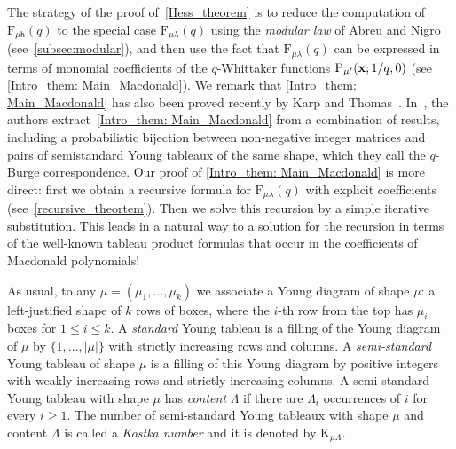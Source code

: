 \documentclass[12pt,a4paper,reqno]{amsart}
\theoremstyle{plain}
\theoremstyle{definition}
\newcommand{\1}{\mathds{1}}
\renewcommand{\P}{\mathrm{P}}
\newcommand{\F}{\mathrm{F}}
\newcommand{\K}{{\mathrm{K}}}
\newcommand{\x}{{\bf x}}
\newcommand{\hes}{\mathsf{h}}
\begin{document}
The strategy of the proof of~\cref{Hess_theorem} is to reduce the computation of  $\F_{\mu\hes}(q)$ to the special case $\F_{\mu\lambda}(q)$ using  the \emph{modular law} of Abreu and Nigro~\cite{Abreu-Nigro} (see~\cref{subsec:modular}), and then use the fact that $\F_{\mu\lambda}(q)$ can be expressed in terms of monomial coefficients of the $q$-Whittaker functions $\P_{\mu'}(\x;1/q,0)$ (see \cref{Intro_them: Main_Macdonald}).
We remark that \cref{Intro_them: Main_Macdonald} has also been proved recently by Karp and Thomas~\cite[Theorem 5.13]{Karp-Thomas}.  
In~\cite{Karp-Thomas}, 
the authors extract~\cref{Intro_them: Main_Macdonald} from a  combination of results, including a probabilistic bijection between non-negative integer matrices and pairs of semistandard Young tableaux of the same shape, which they call the $q$-Burge correspondence. 
Our proof of \cref{Intro_them: Main_Macdonald}
is more direct: first we obtain a recursive formula for $\F_{\mu\lambda}(q)$ with explicit coefficients (see~\cref{recursive_theortem}). 
Then we solve this recursion by a simple iterative substitution. This leads in a natural way to a solution for the recursion in terms of the well-known tableau product formulas that occur in the coefficients of Macdonald polynomials!



As usual, to  any $\mu=(\mu_1,\dots,\mu_k)$ we associate a Young diagram of shape $\mu$: a left-justified shape of $k$ rows of boxes, where the $i$-th row from the top has  $\mu_i$ boxes for $1\leq i\leq k$. %
 A \emph{standard} Young tableau is a filling of the Young diagram
of $\mu$
by $\{1,\ldots,|\mu|\}$
with strictly increasing rows and columns.  A \emph{semi-standard} Young tableau of shape $\mu$ is 
a filling of this Young diagram by positive integers  
with 
weakly increasing rows and strictly increasing columns. 
A semi-standard Young tableau with shape $\mu$ has \emph{content} $\Lambda$ if there are $
\Lambda_i$ occurrences of $i$ for every $i
\geq 1$.  The number of semi-standard Young tableaux with shape $\mu$ and content $\Lambda$ is called a  \emph{Kostka number} and it is denoted by $\K_{\mu\Lambda}$.   
\end{document}
